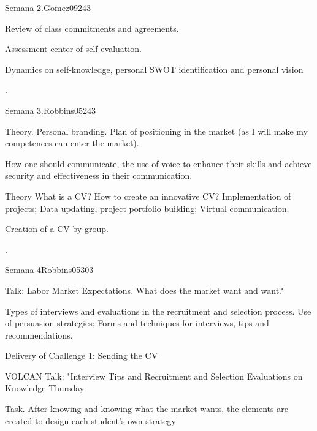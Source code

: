 \begin{syllabus}
\begin{unit}{Semana 2.}{Gomez09}{24}{3}
   \begin{topics}
      \item Review of class commitments and agreements.
      \item Assessment center of self-evaluation.
      \item Dynamics on self-knowledge, personal SWOT identification and personal vision
   \end{topics}

   \begin{unitgoals}
      \item .
      \end{unitgoals}
\end{unit}

\begin{unit}{Semana 3.}{Robbins05}{24}{3}
   \begin{topics}
      \item Theory. Personal branding. Plan of positioning in the market (as I will make my competences can enter the market).
      \item How one should communicate, the use of voice to enhance their skills and achieve security and effectiveness in their communication.
      \item Theory What is a CV? How to create an innovative CV? Implementation of projects; Data updating, project portfolio building; Virtual communication.
      \item Creation of a CV by group.
   \end{topics}

   \begin{unitgoals}
      \item .
   \end{unitgoals}
\end{unit}

\begin{unit}{Semana 4}{Robbins05}{30}{3}
   \begin{topics}
      \item Talk: Labor Market Expectations. What does the market want and want?
      \item Types of interviews and evaluations in the recruitment and selection process. Use of persuasion strategies; Forms and techniques for interviews, tips and recommendations.
      \item Delivery of Challenge 1: Sending the CV
      \item VOLCAN Talk: "Interview Tips and Recruitment and Selection Evaluations on Knowledge Thursday
      \item Task. After knowing and knowing what the market wants, the elements are created to design each student's own strategy
   \end{topics}


\end{unit}
\end{syllabus}
